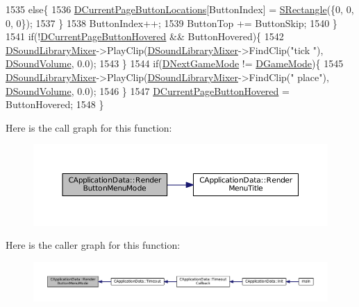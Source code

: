 \begin{DoxyCode}
1535         \textcolor{keywordflow}{else}\{
1536             \hyperlink{classCApplicationData_a3615df8e23cea3ce17f11cf61340a7b4}{DCurrentPageButtonLocations}[ButtonIndex] = 
      \hyperlink{structSRectangle}{SRectangle}(\{0, 0, 0, 0\});
1537         \}
1538         ButtonIndex++;
1539         ButtonTop += ButtonSkip;
1540     \}
1541     \textcolor{keywordflow}{if}(!\hyperlink{classCApplicationData_a96b3a9b5c9965540007dff3fa85587fa}{DCurrentPageButtonHovered} && ButtonHovered)\{
1542         \hyperlink{classCApplicationData_aa1e6876121bb4fb229ec6b930a8a6766}{DSoundLibraryMixer}->PlayClip(\hyperlink{classCApplicationData_aa1e6876121bb4fb229ec6b930a8a6766}{DSoundLibraryMixer}->FindClip(\textcolor{stringliteral}{"tick
      "}), \hyperlink{classCApplicationData_aa6e540f860dcb1929ef36ddce3be3691}{DSoundVolume}, 0.0);
1543     \}
1544     \textcolor{keywordflow}{if}(\hyperlink{classCApplicationData_a3b67edeacd70201dcf96fa9fa8aa2107}{DNextGameMode} != \hyperlink{classCApplicationData_a2f906f2b4208ecb2a057e6b62e549685}{DGameMode})\{
1545         \hyperlink{classCApplicationData_aa1e6876121bb4fb229ec6b930a8a6766}{DSoundLibraryMixer}->PlayClip(\hyperlink{classCApplicationData_aa1e6876121bb4fb229ec6b930a8a6766}{DSoundLibraryMixer}->FindClip(\textcolor{stringliteral}{"
      place"}), \hyperlink{classCApplicationData_aa6e540f860dcb1929ef36ddce3be3691}{DSoundVolume}, 0.0);
1546     \}
1547     \hyperlink{classCApplicationData_a96b3a9b5c9965540007dff3fa85587fa}{DCurrentPageButtonHovered} = ButtonHovered;
1548 \}
\end{DoxyCode}
Here is the call graph for this function\+:
\nopagebreak
\begin{figure}[H]
\begin{center}
\leavevmode
\includegraphics[width=350pt]{classCApplicationData_a4766e5533d32e4194816f5a4ea838bd3_cgraph}
\end{center}
\end{figure}
Here is the caller graph for this function\+:
\nopagebreak
\begin{figure}[H]
\begin{center}
\leavevmode
\includegraphics[width=350pt]{classCApplicationData_a4766e5533d32e4194816f5a4ea838bd3_icgraph}
\end{center}
\end{figure}
\hypertarget{classCApplicationData_a7da1dd0b9a8d7c68d8df5f60b4e94189}{}\label{classCApplicationData_a7da1dd0b9a8d7c68d8df5f60b4e94189} 
